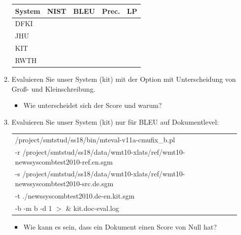 \documentclass[12pt,fleqn]{article}
\begin{document}
\begin{enumerate}
\begin{enumerate}
\begin{table}[h] 
 \begin{center} 
\begin{tabular}{|p{2cm}|p{2.5cm}|p{2.5cm}|p{2.5cm}|p{2.5cm}|} \hline 
 System & NIST & BLEU & Prec. & LP \\  \hline 
DFKI & & & & \\ \hline 
JHU & & & & \\ \hline 
KIT & & & & \\ \hline 
RWTH & & & & \\ \hline 
\end{tabular}
 \end{center}
\end{table}

\vspace{0.5cm} 
\item Evaluieren Sie unser System (kit) mit der Option mit Unterscheidung von Groß- und Kleinschreibung.

\vspace{0.5cm} 
\begin{itemize} 
\item Wie unterscheidet sich der Score und warum?
\end{itemize} 

\vspace{0.5cm} 
\item Evaluieren Sie unser System (kit) nur für BLEU auf Dokumentlevel:

\begin{table}[h] 
 \begin{center} 
\begin{tabular}{l} 
/project/smtstud/ss18/bin/mteval-v11a-cmufix\_b.pl  \\ 
-r /project/smtstud/ss18/data/wmt10-xlats/ref/wmt10-newssyscombtest2010-ref.en.sgm  \\ 
-s /project/smtstud/ss18/data/wmt10-xlats/ref/wmt10-newssyscombtest2010-src.de.sgm  \\ 
-t ./newssyscombtest2010.de-en.kit.sgm  \\ 
-b -m b -d 1    $>$ \&  kit.doc-eval.log \\ 
\end{tabular}
 \end{center}
\end{table}


\vspace{0.5cm} 
\begin{itemize} 
\item Wie kann es sein, dass ein Dokument einen Score von Null hat?
\end{itemize} 


\end{enumerate}
\end{enumerate}
\end{document}

